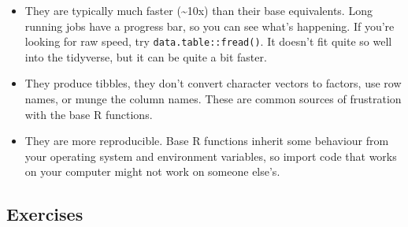 \documentclass[]{book}
\begin{document}
\begin{itemize}
\item
  They are typically much faster (\textasciitilde{}10x) than their base
  equivalents. Long running jobs have a progress bar, so you can see
  what's happening. If you're looking for raw speed, try
  \texttt{data.table::fread()}. It doesn't fit quite so well into the
  tidyverse, but it can be quite a bit faster.
\item
  They produce tibbles, they don't convert character vectors to factors,
  use row names, or munge the column names. These are common sources of
  frustration with the base R functions.
\item
  They are more reproducible. Base R functions inherit some behaviour
  from your operating system and environment variables, so import code
  that works on your computer might not work on someone else's.
\end{itemize}

\subsection{Exercises}\label{exercises-19}
\end{document}
